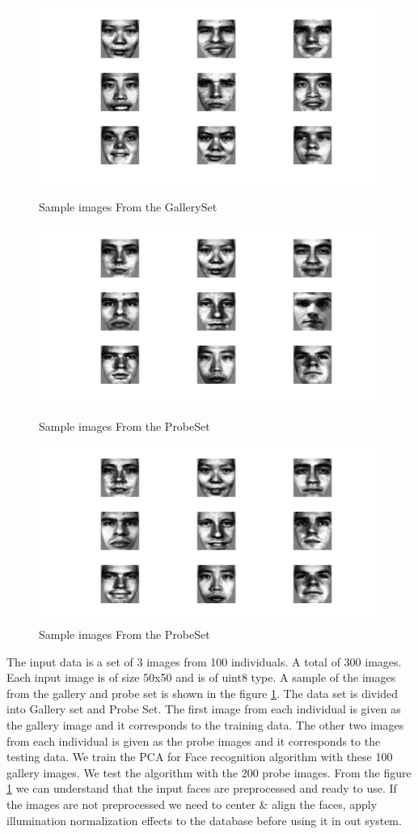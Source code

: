 \documentclass[conference]{IEEEtran}
\begin{document}
\begin{figure}[h!]
\centering
\includegraphics[scale=0.15]{GallerySample.jpg}
\caption{Sample images From the GallerySet }
\includegraphics[scale=0.15]{ProbeSample1.jpg}
\caption{Sample images From the ProbeSet}
\includegraphics[scale=0.15]{ProbeSample2.jpg}
\caption{Sample images From the ProbeSet}
\label{fig:sampleGallery}
\end{figure}
The input data is a set of 3 images from 100 individuals. A total of 300 images. Each input image is of size 50x50 and is of uint8 type. A sample of the images from the gallery  and probe set is shown in the figure \ref{fig:sampleGallery}. The data set is divided into Gallery set and Probe Set. The first image from each individual is given as the gallery image and it corresponds to the training data. The other two images from each individual is given as the probe images and it corresponds to the testing data. We train the PCA for Face recognition algorithm with these 100 gallery images. We test the algorithm with the 200 probe images.  From the figure \ref{fig:sampleGallery} we can understand that the input faces are preprocessed and ready to use. If the images are not preprocessed we need to center \& align the faces, apply illumination normalization effects to the database before using it in out system. 
\end{document}
